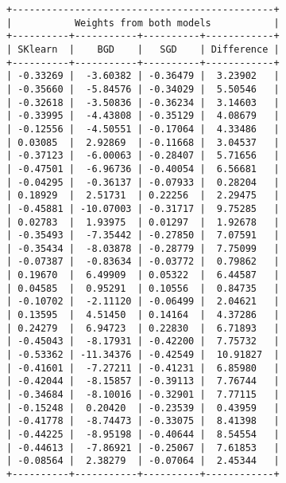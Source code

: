 \documentclass[11pt]{article}
\begin{document}
    \begin{Verbatim}[commandchars=\\\{\}]
+----------------------------------------------+
|           Weights from both models           |
+----------+-----------+----------+------------+
| SKlearn  |    BGD    |   SGD    | Difference |
+----------+-----------+----------+------------+
| -0.33269 |  -3.60382 | -0.36479 |  3.23902   |
| -0.35660 |  -5.84576 | -0.34029 |  5.50546   |
| -0.32618 |  -3.50836 | -0.36234 |  3.14603   |
| -0.33995 |  -4.43808 | -0.35129 |  4.08679   |
| -0.12556 |  -4.50551 | -0.17064 |  4.33486   |
| 0.03085  |  2.92869  | -0.11668 |  3.04537   |
| -0.37123 |  -6.00063 | -0.28407 |  5.71656   |
| -0.47501 |  -6.96736 | -0.40054 |  6.56681   |
| -0.04295 |  -0.36137 | -0.07933 |  0.28204   |
| 0.18929  |  2.51731  | 0.22256  |  2.29475   |
| -0.45881 | -10.07003 | -0.31717 |  9.75285   |
| 0.02783  |  1.93975  | 0.01297  |  1.92678   |
| -0.35493 |  -7.35442 | -0.27850 |  7.07591   |
| -0.35434 |  -8.03878 | -0.28779 |  7.75099   |
| -0.07387 |  -0.83634 | -0.03772 |  0.79862   |
| 0.19670  |  6.49909  | 0.05322  |  6.44587   |
| 0.04585  |  0.95291  | 0.10556  |  0.84735   |
| -0.10702 |  -2.11120 | -0.06499 |  2.04621   |
| 0.13595  |  4.51450  | 0.14164  |  4.37286   |
| 0.24279  |  6.94723  | 0.22830  |  6.71893   |
| -0.45043 |  -8.17931 | -0.42200 |  7.75732   |
| -0.53362 | -11.34376 | -0.42549 |  10.91827  |
| -0.41601 |  -7.27211 | -0.41231 |  6.85980   |
| -0.42044 |  -8.15857 | -0.39113 |  7.76744   |
| -0.34684 |  -8.10016 | -0.32901 |  7.77115   |
| -0.15248 |  0.20420  | -0.23539 |  0.43959   |
| -0.41778 |  -8.74473 | -0.33075 |  8.41398   |
| -0.44225 |  -8.95198 | -0.40644 |  8.54554   |
| -0.44613 |  -7.86921 | -0.25067 |  7.61853   |
| -0.08564 |  2.38279  | -0.07064 |  2.45344   |
+----------+-----------+----------+------------+
    \end{Verbatim}


    
    
    
\end{document}
